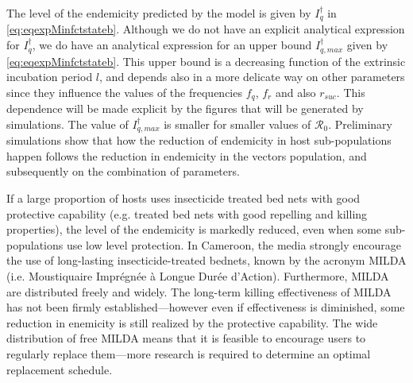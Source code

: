 \documentclass[a4paper]{article}
\newcommand{\varpiVar}{r_{suc}}
\begin{document}
The level of the endemicity predicted by the model is given by  $I_q^\dagger $ in  \eqref{eq:eqexpMinfctstateb}. Although we do not have an explicit analytical  expression for $I_q^\dagger $, we do have an analytical expression for an upper bound $I_{q,max}^\dagger$ given by \eqref{eq:eqexpMinfctstateb}. This upper bound is  a decreasing function of the extrinsic incubation period  $l$, and depends also in a more delicate way on other parameters since they influence the values of the  frequencies $f_q$, $f_r$ and also $\varpiVar $. This dependence will be made explicit by the figures that will be generated by simulations. 
The value of $I_{q,max}^\dagger $ is smaller for smaller values of $\mathcal R_0$. Preliminary simulations show that how the reduction of endemicity in host sub-populations happen follows the reduction in endemicity in the vectors population,  and subsequently on the combination of parameters.  

If a large proportion of hosts uses insecticide treated bed nets with good protective capability (e.g. treated bed nets  with good repelling and killing properties), the level of the endemicity is markedly reduced,  even when some sub-populations use low level protection. In Cameroon, the media strongly encourage the use of long-lasting insecticide-treated bednets, known by the acronym  MILDA (i.e. Moustiquaire Impr\'egn\'ee \`a Longue Dur\'ee d'Action). Furthermore, MILDA are distributed freely and widely. The long-term killing effectiveness of MILDA has not been firmly established---however even if effectiveness is diminished, some reduction in enemicity is still realized by the protective capability.  The wide distribution of free MILDA means that it is feasible to encourage users to regularly replace them---more research is required to determine an optimal replacement schedule.

  
\end{document}
